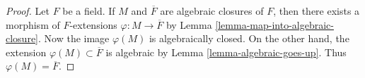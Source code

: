 \documentclass[10pt,a4paper]{amsart}
\theoremstyle{plain}
\theoremstyle{definition}
\theoremstyle{remark}
\numberwithin{equation}{subsection}
\begin{document}
\begin{proof}
Let $F$ be a field. If $M$ and $\overline{F}$ are algebraic closures of
$F$, then there exists a morphism of $F$-extensions
$\varphi : M \to \overline{F}$ by
Lemma \ref{lemma-map-into-algebraic-closure}.
Now the image $\varphi(M)$ is algebraically closed.
On the other hand, the extension $\varphi(M) \subset \overline{F}$
is algebraic by Lemma \ref{lemma-algebraic-goes-up}.
Thus $\varphi(M) = \overline{F}$.
\end{proof}
\end{document}
